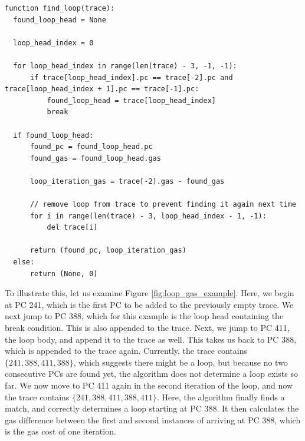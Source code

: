 \begin{lstlisting}[language=Pseudocode, caption={\texttt{find_loop} function}, label={lst:loop_gas_find_loop}, basicstyle=\ttfamily\scriptsize]
function find_loop(trace):
  found_loop_head = None
              
  loop_head_index = 0

  for loop_head_index in range(len(trace) - 3, -1, -1):
      if trace[loop_head_index].pc == trace[-2].pc and trace[loop_head_index + 1].pc == trace[-1].pc:
          found_loop_head = trace[loop_head_index]
          break

  if found_loop_head:
      found_pc = found_loop_head.pc
      found_gas = found_loop_head.gas
      
      loop_iteration_gas = trace[-2].gas - found_gas
      
      // remove loop from trace to prevent finding it again next time
      for i in range(len(trace) - 3, loop_head_index - 1, -1):
          del trace[i]
      
      return (found_pc, loop_iteration_gas)
  else:
      return (None, 0)
\end{lstlisting}

To illustrate this, let us examine Figure \ref{fig:loop_gas_example}. Here, we begin at PC 241,
which is the first PC to be added to the previously empty trace. We next jump to PC 388, which
for this example is the loop head containing the break condition. This is also appended to the trace.
Next, we jump to PC 411, the loop body,  and append it to the trace as well. This takes us back to
PC 388, which is appended to the trace again. Currently, the trace contains $\{241, 388, 411, 388\}$,
which suggests there might be a loop, but because no two consecutive PCs are found yet, the algorithm
does not determine a loop exists so far. We now move to PC 411 again in the second iteration of the loop,
and now the trace contains $\{241, 388, 411, 388, 411\}$. Here, the algorithm finally finds a match, and 
correctly determines a loop starting at PC 388. It then calculates the gas difference between the first and 
second instances of arriving at PC 388, which is the gas cost of one iteration. 

